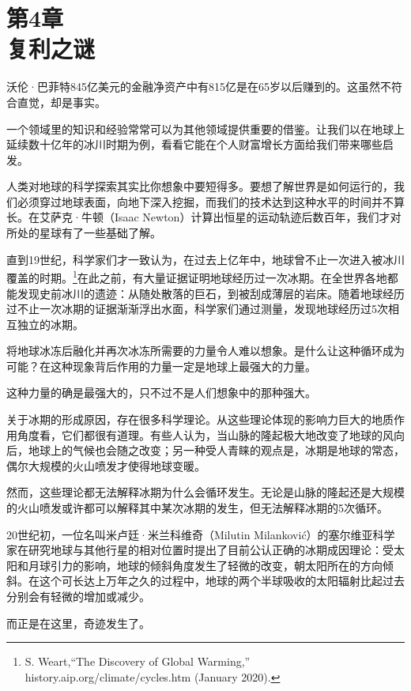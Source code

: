 
\section[第4章\q 复利之谜]{第4章\\ 复利之谜}

{\kaishu

沃伦·巴菲特845亿美元的金融净资产中有815亿是在65岁以后赚到的。这虽然不符合直觉，却是事实。

}

一个领域里的知识和经验常常可以为其他领域提供重要的借鉴。让我们以在地球上延续数十亿年的冰川时期为例，看看它能在个人财富增长方面给我们带来哪些启发。

人类对地球的科学探索其实比你想象中要短得多。要想了解世界是如何运行的，我们必须穿过地球表面，向地下深入挖掘，而我们的技术达到这种水平的时间并不算长。在艾萨克·牛顿（Isaac Newton）计算出恒星的运动轨迹后数百年，我们才对所处的星球有了一些基础了解。

直到19世纪，科学家们才一致认为，在过去上亿年中，地球曾不止一次进入被冰川覆盖的时期。\footnote{S. Weart,“The Discovery of Global Warming,” history.aip.org/climate/cycles.htm (January 2020).}在此之前，有大量证据证明地球经历过一次冰期。在全世界各地都能发现史前冰川的遗迹：从随处散落的巨石，到被刮成薄层的岩床。随着地球经历过不止一次冰期的证据渐渐浮出水面，科学家们通过测量，发现地球经历过5次相互独立的冰期。

将地球冰冻后融化并再次冰冻所需要的力量令人难以想象。是什么让这种循环成为可能？在这种现象背后作用的力量一定是地球上最强大的力量。

这种力量的确是最强大的，只不过不是人们想象中的那种强大。

关于冰期的形成原因，存在很多科学理论。从这些理论体现的影响力巨大的地质作用角度看，它们都很有道理。有些人认为，当山脉的隆起极大地改变了地球的风向后，地球上的气候也会随之改变；另一种受人青睐的观点是，冰期是地球的常态，偶尔大规模的火山喷发才使得地球变暖。

然而，这些理论都无法解释冰期为什么会循环发生。无论是山脉的隆起还是大规模的火山喷发或许都可以解释其中某次冰期的发生，但无法解释冰期的5次循环。

20世纪初，一位名叫米卢廷·米兰科维奇（Milutin Milanković）的塞尔维亚科学家在研究地球与其他行星的相对位置时提出了目前公认正确的冰期成因理论：受太阳和月球引力的影响，地球的倾斜角度发生了轻微的改变，朝太阳所在的方向倾斜。在这个可长达上万年之久的过程中，地球的两个半球吸收的太阳辐射比起过去分别会有轻微的增加或减少。

而正是在这里，奇迹发生了。

